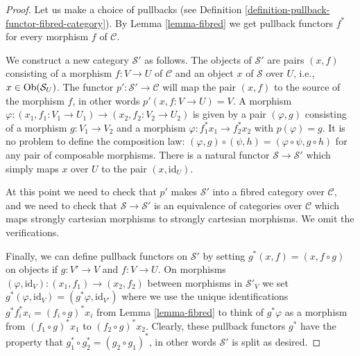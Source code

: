 \begin{proof}
Let us make a choice of pullbacks (see
Definition \ref{definition-pullback-functor-fibred-category}).
By Lemma \ref{lemma-fibred} we get pullback functors $f^*$ for
every morphism $f$ of $\mathcal{C}$.

\medskip\noindent
We construct a new category $\mathcal{S}'$ as follows.
The objects of $\mathcal{S}'$ are pairs $(x, f)$
consisting of a morphism $f : V \to U$ of $\mathcal{C}$
and an object $x$ of $\mathcal{S}$ over $U$, i.e.,
$x\in \mathop{\mathrm{Ob}}\nolimits(\mathcal{S}_U)$. The functor
$p' : \mathcal{S}' \to \mathcal{C}$ will map the pair $(x, f)$ to the source
of the morphism $f$, in other words $p'(x, f : V\to U) = V$. A morphism
$\varphi : (x_1, f_1: V_1 \to U_1) \to (x_2, f_2 : V_2 \to U_2)$ is given by a
pair $(\varphi, g)$ consisting of a morphism $g : V_1 \to V_2$ and a morphism
$\varphi : f_1^\ast x_1 \to f_2^\ast x_2$ with $p(\varphi) = g$. It is no
problem to define the composition law: $(\varphi, g) \circ (\psi, h) =
(\varphi \circ \psi, g\circ h)$ for any pair of composable morphisms.
There is a natural functor $\mathcal{S} \to \mathcal{S}'$ which simply maps
$x$ over $U$ to the pair $(x, \text{id}_U)$.

\medskip\noindent
At this point we need to check that $p'$ makes $\mathcal{S}'$ into a
fibred category over $\mathcal{C}$, and we need to check that
$\mathcal{S} \to \mathcal{S}'$ is an equivalence of categories over
$\mathcal{C}$ which maps strongly cartesian morphisms to strongly
cartesian morphisms. We omit the verifications.

\medskip\noindent
Finally, we can define pullback functors on $\mathcal{S}'$
by setting $g^\ast(x, f) = (x, f \circ g)$ on objects if
$g : V' \to V$ and $f : V \to U$. On morphisms
$(\varphi, \text{id}_V) : (x_1, f_1) \to (x_2, f_2)$
between morphisms in $\mathcal{S}'_V$ we set $g^\ast(\varphi, \text{id}_V) =
(g^\ast\varphi, \text{id}_{V'})$ where we use the unique identifications
$g^\ast f_i^\ast x_i = (f_i \circ g)^\ast x_i$ from Lemma
\ref{lemma-fibred} to think of $g^\ast\varphi$ as a morphism from
$(f_1 \circ g)^\ast x_1$ to $(f_2 \circ g)^\ast x_2$. Clearly, these pullback
functors $g^\ast$ have the property that
$g_1^\ast \circ g_2^\ast = (g_2\circ g_1)^\ast$, in other words $\mathcal{S}'$
is split as desired.
\end{proof}


















